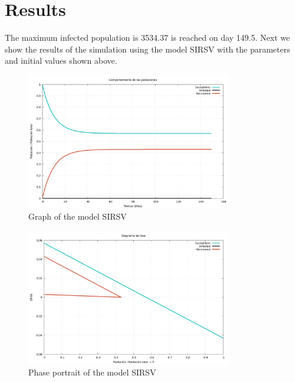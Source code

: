 \documentclass{article}
\begin{document}
\section*{Results}
The maximum infected population is 3534.37 is reached on day 149.5.
Next we show the results of the simulation using the model SIRSV with the parameters and initial values shown above.
\begin{figure}[H]
\centering
\includegraphics[width=0.8\textwidth]{./data/PryectoSIRSVAC/graph-SIRSV.png}
\caption{Graph of the model SIRSV}
\end{figure}
\begin{figure}[H]
\centering
\includegraphics[width=0.8\textwidth]{./data/PryectoSIRSVAC/phase-SIRSV.png}
\caption{Phase portrait of the model SIRSV}
\end{figure}
\end{document}
